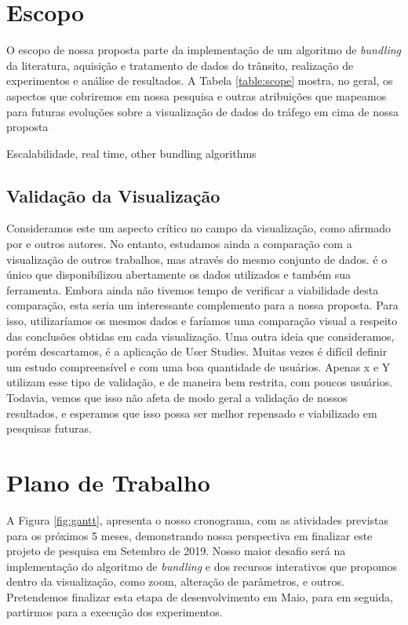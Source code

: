 \section{Escopo}
  
O escopo de nossa proposta parte da implementação de um algoritmo de
\emph{bundling} da literatura, aquisição e tratamento de dados do trânsito,
realização de experimentos e análise de resultados.  A Tabela \ref{table:scope}
mostra, no geral, os aspectos que cobriremos em nossa pesquisa e outras
atribuições que mapeamos para futuras evoluções sobre a visualização de dados
do tráfego em cima de nossa proposta

Escalabilidade, real time, other bundling algorithms

\subsection{Validação da Visualização}
  Consideramos este um aspecto crítico no campo da visualização, como afirmado
por \citet{Telea2018} e outros autores. No entanto, estudamos ainda a comparação
com a visualização de outros trabalhos, mas através do mesmo conjunto de dados.
\citet{Guo2011} é o único que disponibilizou abertamente os dados utilizados
e também sua ferramenta. Embora ainda não tivemos tempo de verificar a viabilidade
desta comparação, esta seria um interessante complemento para a nossa proposta.
Para isso, utilizaríamos os mesmos dados e faríamos uma comparação visual a respeito
das conclusões obtidas em cada visualização. Uma outra ideia que consideramos, porém
descartamos, é a aplicação de User Studies. Muitas vezes é difícil definir um estudo
compreensível e com uma boa quantidade de usuários. Apenas x e Y utilizam esse tipo
de validação, e de maneira bem restrita, com poucos usuários. Todavia, vemos que
isso não afeta de modo geral a validação de nossos resultados, e esperamos que isso
possa ser melhor repensado e viabilizado em pesquisas futuras.

\section{Plano de Trabalho}

 A Figura \ref{fig:gantt}, apresenta o nosso cronograma, com as atividades
previstas para os próximos 5 meses, demonstrando nossa perspectiva em finalizar
este projeto de pesquisa em Setembro de 2019.  Nosso maior desafio será na
implementação do algoritmo de \emph{bundling} e dos recursos interativos que
propomos dentro da visualização, como zoom, alteração de parâmetros, e outros.
Pretendemos finalizar esta etapa de desenvolvimento em Maio, para em seguida,
partirmos para a execução dos experimentos.


